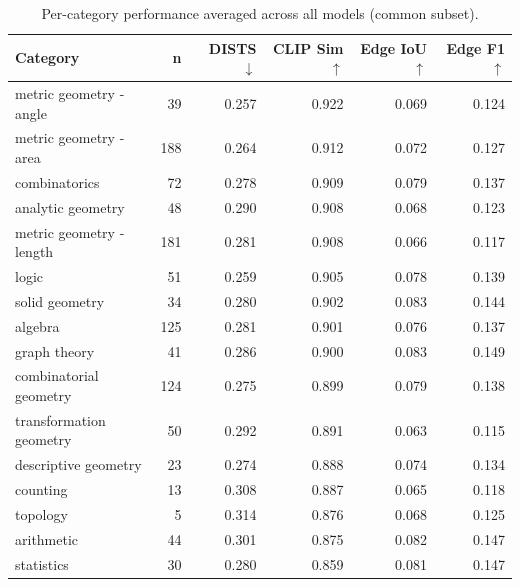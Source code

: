 \begin{table}[t]
\centering
\caption{Per-category performance averaged across all models (common subset).}
\label{tab:categories}
\small
\begin{tabular}{l r r r r r}
\toprule
Category & n & DISTS $\downarrow$ & CLIP Sim $\uparrow$ & Edge IoU $\uparrow$ & Edge F1 $\uparrow$ \\
\midrule
metric geometry - angle & 39 & 0.257 & 0.922 & 0.069 & 0.124 \\
metric geometry - area & 188 & 0.264 & 0.912 & 0.072 & 0.127 \\
combinatorics & 72 & 0.278 & 0.909 & 0.079 & 0.137 \\
analytic geometry & 48 & 0.290 & 0.908 & 0.068 & 0.123 \\
metric geometry - length & 181 & 0.281 & 0.908 & 0.066 & 0.117 \\
logic & 51 & 0.259 & 0.905 & 0.078 & 0.139 \\
solid geometry & 34 & 0.280 & 0.902 & 0.083 & 0.144 \\
algebra & 125 & 0.281 & 0.901 & 0.076 & 0.137 \\
graph theory & 41 & 0.286 & 0.900 & 0.083 & 0.149 \\
combinatorial geometry & 124 & 0.275 & 0.899 & 0.079 & 0.138 \\
transformation geometry & 50 & 0.292 & 0.891 & 0.063 & 0.115 \\
descriptive geometry & 23 & 0.274 & 0.888 & 0.074 & 0.134 \\
counting & 13 & 0.308 & 0.887 & 0.065 & 0.118 \\
topology & 5 & 0.314 & 0.876 & 0.068 & 0.125 \\
arithmetic & 44 & 0.301 & 0.875 & 0.082 & 0.147 \\
statistics & 30 & 0.280 & 0.859 & 0.081 & 0.147 \\
\bottomrule
\end{tabular}
\end{table}